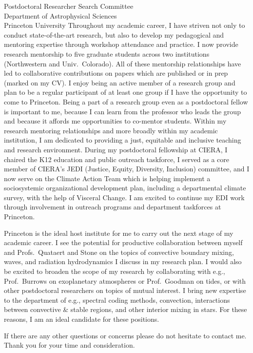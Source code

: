 \documentclass[12pt]{letter}
\begin{document}
\begin{letter}{
               Postdoctoral Researcher Search Committee \\
               Department of Astrophysical Sciences \\
               Princeton University
           }
    Throughout my academic career, I have striven not only to conduct state-of-the-art research, but also to develop my pedagogical and mentoring expertise through workshop attendance and practice.
    I now provide research mentorship to five graduate students across two institutions (Northwestern and Univ.~Colorado).
    All of these mentorship relationships have led to collaborative contributions on papers which are published or in prep (marked on my CV).
    I enjoy being an active member of a research group and plan to be a regular participant of at least one group if I have the opportunity to come to Princeton.
    Being a part of a research group even as a postdoctoral fellow is important to me, because I can learn from the professor who leads the group and because it affords me opportunities to co-mentor students.
    Within my research mentoring relationships and more broadly within my academic institution, I am dedicated to providing a just, equitable and inclusive teaching and research environment.
    During my postdoctoral fellowship at CIERA, I chaired the K12 education and public outreach taskforce, I served as a core member of CIERA's JEDI (Justice, Equity, Diversity, Inclusion) committee, and I now serve on the Climate Action Team which is helping implement a sociosystemic organizational development plan, including a departmental climate survey, with the help of Visceral Change.
    I am excited to continue my EDI work through involvement in outreach programs and department taskforces at Princeton.

    Princeton is the ideal host institute for me to carry out the next stage of my academic career.
    I see the potential for productive collaboration between myself and Profs.~Quataert and Stone on the topics of convective boundary mixing, waves, and radiation hydrodynamics I discuss in my research plan.
    I would also be excited to broaden the scope of my research by collaborating with e.g., Prof.~Burrows on exoplanetary atmospheres or Prof.~Goodman on tides, or with other postdoctoral researchers on topics of mutual interest.
    I bring new expertise to the department of e.g., spectral coding methods, convection, interactions between convective \& stable regions, and other interior mixing in stars.
    For these reasons, I am an ideal candidate for these positions.

    If there are any other questions or concerns please do not hesitate to contact me.
    Thank you for your time and consideration.


\end{letter}
\end{document}
